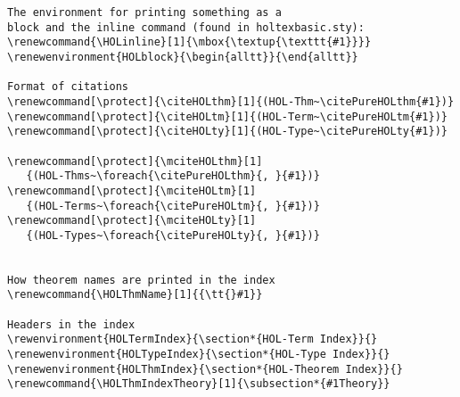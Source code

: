 \documentclass{scrartcl}
\begin{document}
\begin{verbatim}
The environment for printing something as a 
block and the inline command (found in holtexbasic.sty):
\renewcommand{\HOLinline}[1]{\mbox{\textup{\texttt{#1}}}}
\renewenvironment{HOLblock}{\begin{alltt}}{\end{alltt}}

Format of citations
\renewcommand[\protect]{\citeHOLthm}[1]{(HOL-Thm~\citePureHOLthm{#1})}
\renewcommand[\protect]{\citeHOLtm}[1]{(HOL-Term~\citePureHOLtm{#1})}
\renewcommand[\protect]{\citeHOLty}[1]{(HOL-Type~\citePureHOLty{#1})}

\renewcommand[\protect]{\mciteHOLthm}[1]
   {(HOL-Thms~\foreach{\citePureHOLthm}{, }{#1})}
\renewcommand[\protect]{\mciteHOLtm}[1]
   {(HOL-Terms~\foreach{\citePureHOLtm}{, }{#1})}
\renewcommand[\protect]{\mciteHOLty}[1]
   {(HOL-Types~\foreach{\citePureHOLty}{, }{#1})}


How theorem names are printed in the index
\renewcommand{\HOLThmName}[1]{{\tt{}#1}}

Headers in the index
\rewenvironment{HOLTermIndex}{\section*{HOL-Term Index}}{}
\renewenvironment{HOLTypeIndex}{\section*{HOL-Type Index}}{}
\renewenvironment{HOLThmIndex}{\section*{HOL-Theorem Index}}{}
\renewcommand{\HOLThmIndexTheory}[1]{\subsection*{#1Theory}}
\end{verbatim}
\pagebreak
\end{document}
